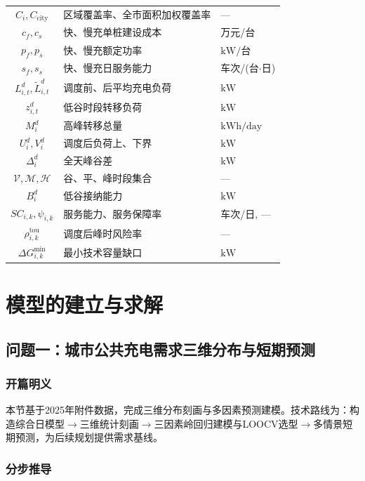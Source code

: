 \documentclass[a4paper,12pt]{ctexart}
\begin{document}
\begin{longtable}{cll}
$C_{i},C_{\mathrm{city}}$ & 区域覆盖率、全市面积加权覆盖率 & --- \\
$c_{f},c_{s}$ & 快、慢充单桩建设成本 & 万元/台 \\
$p_{f},p_{s}$ & 快、慢充额定功率 & $\mathrm{kW/台}$ \\
$s_{f},s_{s}$ & 快、慢充日服务能力 & 车次/(台$\cdot$日) \\
$L_{i,t}^{d},\widetilde{L}_{i,t}^{d}$ & 调度前、后平均充电负荷 & $\mathrm{kW}$ \\
$z_{i,t}^{d}$ & 低谷时段转移负荷 & $\mathrm{kW}$ \\
$M_{i}^{d}$ & 高峰转移总量 & $\mathrm{kWh/day}$ \\
$U_{i}^{d},V_{i}^{d}$ & 调度后负荷上、下界 & $\mathrm{kW}$ \\
$\Delta_{i}^{d}$ & 全天峰谷差 & $\mathrm{kW}$ \\
$\mathcal{V},\mathcal{M},\mathcal{H}$ & 谷、平、峰时段集合 & --- \\
$B_{i}^{d}$ & 低谷接纳能力 & $\mathrm{kW}$ \\
$SC_{i,k},\psi_{i,k}$ & 服务能力、服务保障率 & 车次/日, --- \\
$\rho_{i,k}^{\mathrm{tou}}$ & 调度后峰时风险率 & --- \\
$\Delta G_{i,k}^{\min}$ & 最小技术容量缺口 & $\mathrm{kW}$ \\
\bottomrule
\end{longtable}

\section{模型的建立与求解}
\subsection{问题一：城市公共充电需求三维分布与短期预测}

\subsubsection{开篇明义}
本节基于2025年附件数据，完成三维分布刻画与多因素预测建模。技术路线为：构造综合日模型$\to$三维统计刻画$\to$三因素岭回归建模与LOOCV选型$\to$多情景短期预测，为后续规划提供需求基线。

\subsubsection{分步推导}
\end{document}
